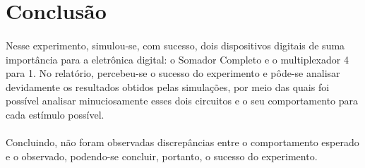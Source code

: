 \documentclass[a4paper,12pt]{article}
\begin{document}
\section{Conclusão}

\paragraph{}
Nesse experimento, simulou-se, com sucesso, dois dispositivos digitais de suma importância para a eletrônica digital: o Somador Completo e o multiplexador 4 para 1. No relatório, percebeu-se o sucesso do experimento e pôde-se analisar devidamente os resultados obtidos pelas simulações, por meio das quais foi possível analisar minuciosamente esses dois circuitos e o seu comportamento para cada estímulo possível.

\paragraph{}
Concluindo, não foram observadas discrepâncias entre o comportamento esperado e o observado, podendo-se concluir, portanto, o sucesso do experimento.
\end{document}

